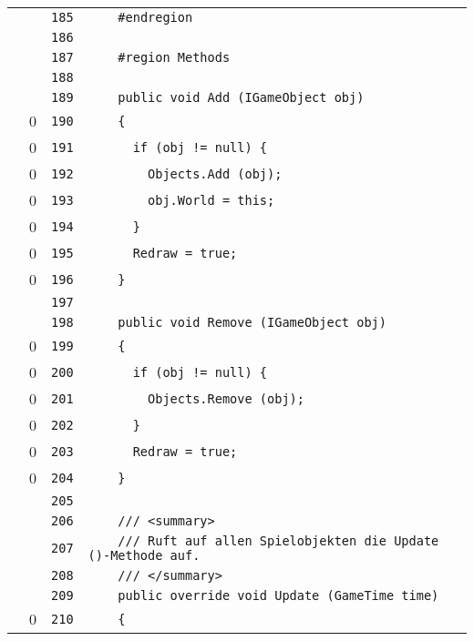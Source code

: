 \documentclass[a4paper,10pt]{article}
\begin{document}
\begin{longtable}[l]{lrrl}
\cellcolor{gray} &  & \verb~185~ & \verb~    #endregion~\\
\cellcolor{gray} &  & \verb~186~ & \verb~~\\
\cellcolor{gray} &  & \verb~187~ & \verb~    #region Methods~\\
\cellcolor{gray} &  & \verb~188~ & \verb~~\\
\cellcolor{gray} &  & \verb~189~ & \verb~    public void Add (IGameObject obj)~\\
\cellcolor{red} & 0 & \verb~190~ & \verb~    {~\\
\cellcolor{red} & 0 & \verb~191~ & \verb~      if (obj != null) {~\\
\cellcolor{red} & 0 & \verb~192~ & \verb~        Objects.Add (obj);~\\
\cellcolor{red} & 0 & \verb~193~ & \verb~        obj.World = this;~\\
\cellcolor{red} & 0 & \verb~194~ & \verb~      }~\\
\cellcolor{red} & 0 & \verb~195~ & \verb~      Redraw = true;~\\
\cellcolor{red} & 0 & \verb~196~ & \verb~    }~\\
\cellcolor{gray} &  & \verb~197~ & \verb~~\\
\cellcolor{gray} &  & \verb~198~ & \verb~    public void Remove (IGameObject obj)~\\
\cellcolor{red} & 0 & \verb~199~ & \verb~    {~\\
\cellcolor{red} & 0 & \verb~200~ & \verb~      if (obj != null) {~\\
\cellcolor{red} & 0 & \verb~201~ & \verb~        Objects.Remove (obj);~\\
\cellcolor{red} & 0 & \verb~202~ & \verb~      }~\\
\cellcolor{red} & 0 & \verb~203~ & \verb~      Redraw = true;~\\
\cellcolor{red} & 0 & \verb~204~ & \verb~    }~\\
\cellcolor{gray} &  & \verb~205~ & \verb~~\\
\cellcolor{gray} &  & \verb~206~ & \verb~    /// <summary>~\\
\cellcolor{gray} &  & \verb~207~ & \verb~    /// Ruft auf allen Spielobjekten die Update ()-Methode auf.~\\
\cellcolor{gray} &  & \verb~208~ & \verb~    /// </summary>~\\
\cellcolor{gray} &  & \verb~209~ & \verb~    public override void Update (GameTime time)~\\
\cellcolor{red} & 0 & \verb~210~ & \verb~    {~\\

\end{longtable}
\end{document}
